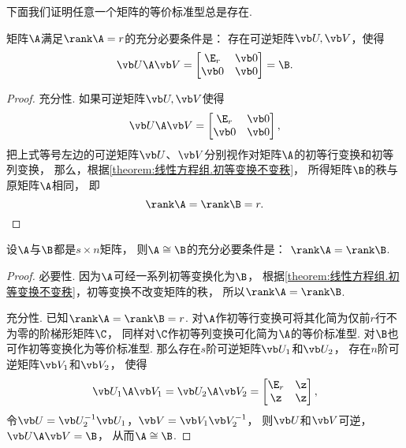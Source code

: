 下面我们证明任意一个矩阵的等价标准型总是存在.
\begin{theorem}\label{theorem:矩阵乘积的秩.等价标准型的存在性}
矩阵\(\A\)满足\(\rank\A=r\)的充分必要条件是：
存在可逆矩阵\(\P,\Q\)，使得\[
	\P \A \Q
	= \begin{bmatrix}
		\E_r & \vb0 \\
		\vb0 & \vb0
	\end{bmatrix} = \B.
\]
\begin{proof}
充分性.
如果可逆矩阵\(\P,\Q\)使得\[
	\P\A\Q
	= \begin{bmatrix}
		\E_r & \vb0 \\
		\vb0 & \vb0
	\end{bmatrix},
\]
把上式等号左边的可逆矩阵\(\P\)、\(\Q\)分别视作对矩阵\(\A\)的初等行变换和初等列变换，
那么，根据\cref{theorem:线性方程组.初等变换不变秩}，
所得矩阵\(\B\)的秩与原矩阵\(\A\)相同，
即\[
	\rank\A = \rank\B = r.
	\qedhere
\]
\end{proof}
\end{theorem}

\begin{theorem}\label{theorem:矩阵乘积的秩.矩阵等价的充分必要条件}
设\(\A\)与\(\B\)都是\(s \times n\)矩阵，
则\(\A \cong \B\)的充分必要条件是：
\(\rank\A = \rank\B\).
\begin{proof}
必要性.
因为\(\A\)可经一系列初等变换化为\(\B\)，
根据\cref{theorem:线性方程组.初等变换不变秩}，初等变换不改变矩阵的秩，
所以\(\rank\A = \rank\B\).

充分性.
已知\(\rank\A = \rank\B = r\).
对\(\A\)作初等行变换可将其化简为仅前\(r\)行不为零的阶梯形矩阵\(\C\)，
同样对\(\C\)作初等列变换可化简为\(\A\)的等价标准型.
对\(\B\)也可作初等变换化为等价标准型.
那么存在\(s\)阶可逆矩阵\(\P_1\)和\(\P_2\)，
存在\(n\)阶可逆矩阵\(\Q_1\)和\(\Q_2\)，
使得\[
	\P_1 \A \Q_1 = \P_2 \A \Q_2
	= \begin{bmatrix} \E_r & \z \\ \z & \z \end{bmatrix},
\]
令\(\P = \P_2^{-1} \P_1\)，\(\Q = \Q_1 \Q_2^{-1}\)，
则\(\P\)和\(\Q\)可逆，
\(\P \A \Q = \B\)，
从而\(\A \cong \B\).
\end{proof}
\end{theorem}

